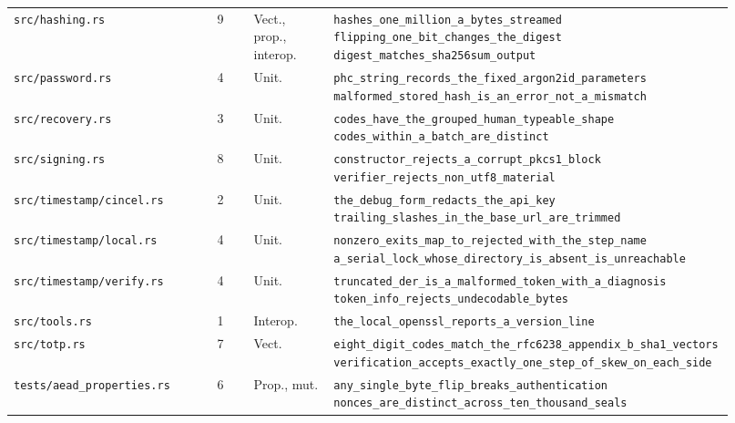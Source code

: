 \begin{longtable}{@{}L{0.285\linewidth}C{0.05\linewidth}L{0.115\linewidth}L{0.47\linewidth}@{}}
  \texttt{src/hashing.rs} & 9 & Vect., prop., interop. & \texttt{hashes\_one\_million\_a\_bytes\_streamed}\newline
    \texttt{flipping\_one\_bit\_changes\_the\_digest}\newline
    \texttt{digest\_matches\_sha256sum\_output} \\
  \texttt{src/password.rs} & 4 & Unit. & \texttt{phc\_string\_records\_the\_fixed\_argon2id\_parameters}\newline
    \texttt{malformed\_stored\_hash\_is\_an\_error\_not\_a\_mismatch} \\
  \texttt{src/recovery.rs} & 3 & Unit. & \texttt{codes\_have\_the\_grouped\_human\_typeable\_shape}\newline
    \texttt{codes\_within\_a\_batch\_are\_distinct} \\
  \texttt{src/signing.rs} & 8 & Unit. & \texttt{constructor\_rejects\_a\_corrupt\_pkcs1\_block}\newline
    \texttt{verifier\_rejects\_non\_utf8\_material} \\
  \texttt{src/timestamp/\allowbreak{}cincel.rs} & 2 & Unit. & \texttt{the\_debug\_form\_redacts\_the\_api\_key}\newline
    \texttt{trailing\_slashes\_in\_the\_base\_url\_are\_trimmed} \\
  \texttt{src/timestamp/\allowbreak{}local.rs} & 4 & Unit. & \texttt{nonzero\_exits\_map\_to\_rejected\_with\_the\_step\_name}\newline
    \texttt{a\_serial\_lock\_whose\_directory\_is\_absent\_is\_unreachable} \\
  \texttt{src/timestamp/\allowbreak{}verify.rs} & 4 & Unit. & \texttt{truncated\_der\_is\_a\_malformed\_token\_with\_a\_diagnosis}\newline
    \texttt{token\_info\_rejects\_undecodable\_bytes} \\
  \texttt{src/tools.rs} & 1 & Interop. & \texttt{the\_local\_openssl\_reports\_a\_version\_line} \\
  \texttt{src/totp.rs} & 7 & Vect. & \texttt{eight\_digit\_codes\_match\_the\_rfc6238\_appendix\_b\_sha1\_vectors}\newline
    \texttt{verification\_accepts\_exactly\_one\_step\_of\_skew\_on\_each\_side} \\
  \texttt{tests/aead\_properties.rs} & 6 & Prop., mut. & \texttt{any\_single\_byte\_flip\_breaks\_authentication}\newline
    \texttt{nonces\_are\_distinct\_across\_ten\_thousand\_seals} \\

\end{longtable}

